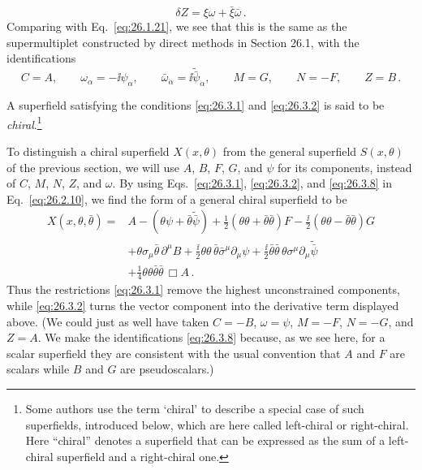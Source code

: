 \begin{equation}
  \delta Z=\xi\omega+\bar\xi\bar\omega\,.
  \tag{26.3.7}\label{eq:26.3.7}
\end{equation}
Comparing with Eq.~\eqref{eq:26.1.21}, we see that this is the same as the
supermultiplet constructed by direct methods in Section 26.1, with the
identifications
\begin{equation}
  C=A,\qquad
  \omega_\alpha=-\ii\psi_\alpha,\qquad
  \bar\omega_{\dot\alpha}
    =\ii\widetilde{\bar\psi}_{\dot\alpha},\qquad
  M=G,\qquad
  N=-F,\qquad
  Z=B\,.
  \tag{26.3.8}\label{eq:26.3.8}
\end{equation}

A superfield satisfying the conditions \eqref{eq:26.3.1} and
\eqref{eq:26.3.2} is said to be
\emph{chiral}.\footnote{Some authors use the term `chiral' to describe a
special case of such superfields, introduced below, which are here called
left-chiral or right-chiral.  Here ``chiral'' denotes a superfield that can
be expressed as the sum of a left-chiral superfield and a right-chiral one.}

To distinguish a chiral superfield $X(x,\theta)$ from the general superfield
$S(x,\theta)$ of the previous section, we will use $A$, $B$, $F$, $G$, and
$\psi$ for its components, instead of $C$, $M$, $N$, $Z$, and $\omega$. By
using Eqs.~\eqref{eq:26.3.1}, \eqref{eq:26.3.2}, and \eqref{eq:26.3.8} in
Eq.~\eqref{eq:26.2.10}, we find the form of a general chiral superfield to be
\begin{equation}
  \begin{aligned}
  X(x,\theta,\bar\theta)={}&
  A-(\theta\psi+\bar\theta\widetilde{\bar\psi})
  +\frac12(\theta\theta+\bar\theta\bar\theta)F
  -\frac{\ii}{2}(\theta\theta-\bar\theta\bar\theta)G\\
  &+\theta\sigma_\mu\bar\theta\,\partial^\mu B
  +\frac{\ii}{2}\theta\theta\,
     \bar\theta\bar\sigma^\mu\partial_\mu\psi
  +\frac{\ii}{2}\bar\theta\bar\theta\,
     \theta\sigma^\mu\partial_\mu\widetilde{\bar\psi}\\
  &+\frac14\theta\theta\bar\theta\bar\theta\,\Box A\,.
  \end{aligned}
  \tag{26.3.9}\label{eq:26.3.9}
\end{equation}
Thus the restrictions \eqref{eq:26.3.1} remove the highest unconstrained
components, while \eqref{eq:26.3.2} turns the vector component into the
derivative term displayed above.
(We could just as well have taken $C=-B$, $\omega=\psi$, $M=-F$, $N=-G$,
and $Z=A$. We make the identifications \eqref{eq:26.3.8} because, as we see
here, for a scalar superfield they are consistent with the usual convention
that $A$ and $F$ are scalars while $B$ and $G$ are pseudoscalars.)

